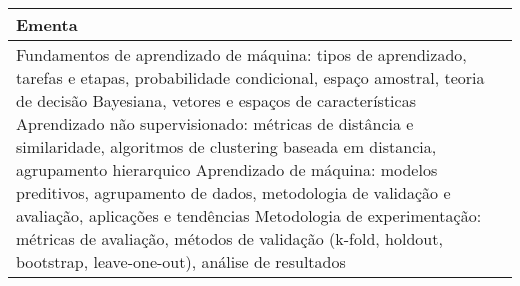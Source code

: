 \begin{quadro}[ht!]
\begin{tabular}{|p{3cm} p{2cm} p{3cm} p{2cm} p{3cm} p{2cm}|}
\multicolumn{6}{|p{15cm}|}{\cellcolor{blue1} Ementa} \\\hline
\hline\multicolumn{6}{|p{15cm}|}{\scriptsize Fundamentos de aprendizado de máquina: tipos de aprendizado, tarefas e etapas, probabilidade condicional, espaço amostral, teoria de decisão Bayesiana, vetores e espaços de características Aprendizado não supervisionado: métricas de distância e similaridade, algoritmos de clustering baseada em distancia, agrupamento hierarquico Aprendizado de máquina: modelos preditivos, agrupamento de dados, metodologia de validação e avaliação, aplicações e tendências Metodologia de experimentação: métricas de avaliação, métodos de validação (k-fold, holdout, bootstrap, leave-one-out), análise de resultados}\\\hline
\hline
	\end{tabular}
\end{quadro}
